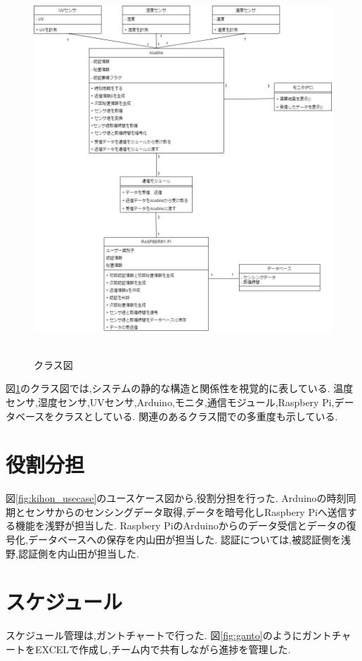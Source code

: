 \begin{figure}[H]
\begin{center}
	\includegraphics[height=140mm]{kihon_class.png}
	\caption{クラス図}
	\label{fig:kihon_class}
\end{center}
\end{figure}
図\ref{fig:kihon_class}のクラス図では,システムの静的な構造と関係性を視覚的に表している.
温度センサ,湿度センサ,UVセンサ,Arduino,モニタ,通信モジュール,Raspbery Pi,データベースをクラスとしている.
関連のあるクラス間での多重度も示している.

\section{役割分担}
図\ref{fig:kihon_usecase}のユースケース図から,役割分担を行った.
Arduinoの時刻同期とセンサからのセンシングデータ取得,データを暗号化しRaspbery Piへ送信する機能を浅野が担当した.
Raspbery PiのArduinoからのデータ受信とデータの復号化,データベースへの保存を内山田が担当した.
認証については,被認証側を浅野,認証側を内山田が担当した.

\section{スケジュール}
スケジュール管理は,ガントチャートで行った.
図\ref{fig:ganto}のようにガントチャートをEXCELで作成し,チーム内で共有しながら進捗を管理した.

